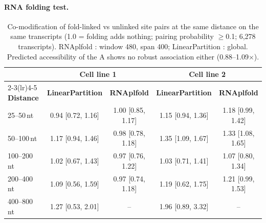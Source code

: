 \documentclass[11pt,a4paper]{article}
\begin{document}
\paragraph{RNA folding test.}
\label{app:folding}

\begin{table}[H]
    \centering\small
    \begin{tabular}{lcccc}
        \toprule
        & \multicolumn{2}{c}{\textbf{Cell line 1}} & \multicolumn{2}{c}{\textbf{Cell line 2}} \\
        \cmidrule(lr){2-3}\cmidrule(lr){4-5}
        \textbf{Distance} & \textbf{LinearPartition} & \textbf{RNAplfold} & \textbf{LinearPartition} & \textbf{RNAplfold} \\
        \midrule
        25--50\,nt & 0.94 [0.72, 1.16] & 1.00 [0.85, 1.17] & 1.15 [0.94, 1.36] & 1.18 [0.99, 1.42] \\
        50--100\,nt & 1.17 [0.94, 1.46] & 0.98 [0.78, 1.18] & 1.35 [1.09, 1.67] & 1.33 [1.08, 1.65] \\
        100--200\,nt & 1.02 [0.67, 1.43] & 0.97 [0.76, 1.22] & 1.03 [0.71, 1.41] & 1.07 [0.80, 1.34] \\
        200--400\,nt & 1.09 [0.56, 1.59] & 0.97 [0.74, 1.18] & 1.19 [0.62, 1.75] & 1.21 [0.99, 1.53] \\
        400--800\,nt & 1.27 [0.53, 2.01] & -- & 1.96 [0.89, 3.32] & -- \\
        \bottomrule
    \end{tabular}
    \caption{Co-modification of fold-linked vs unlinked site pairs at the same
    distance on the same transcripts (1.0 = folding adds nothing; pairing
    probability $\ge$0.1; 6,278 transcripts). RNAplfold \citep{lorenz2011}: window 480, span
    400; LinearPartition \citep{zhang2020linpart}: global. Predicted accessibility of the A shows no
    robust association either (0.88--1.09$\times$).}
\end{table}
\end{document}
